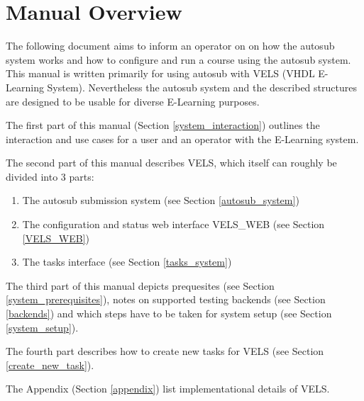 \section{Manual Overview} \label{overview}

The following document aims to inform an operator on on how the autosub system works
and how to configure and run a course using the autosub system. This manual is written
primarily for using autosub with VELS (VHDL E-Learning System). Nevertheless the autosub
system and the described structures are designed to be usable for diverse E-Learning
purposes.

The first part of this manual (Section \ref{system_interaction}) outlines the
interaction and use cases for a user and an operator with the E-Learning system.

The second part of this manual describes VELS, which itself can roughly be divided
into 3 parts:
\begin{enumerate}
    \item The autosub submission system (see Section \ref{autosub_system})
    \item The configuration and status web interface VELS\_WEB (see Section
	      \ref{VELS_WEB})
    \item The tasks interface (see Section \ref{tasks_system})
\end{enumerate}

The third part of this manual depicts prequesites (see Section \ref{system_prerequisites}), notes
on supported testing backends (see Section \ref{backends}) and which steps have to be taken for 
system setup (see Section \ref{system_setup}).

The fourth part describes how to create new tasks for VELS (see Section \ref{create_new_task}).

The Appendix (Section \ref{appendix}) list implementational details of VELS.
